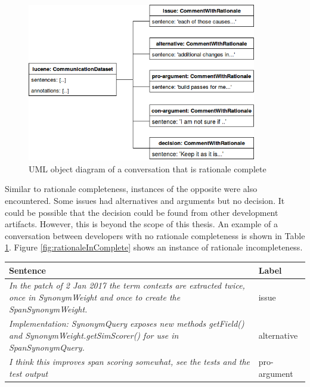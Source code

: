 \documentclass[a4paper,12pt,twoside]{report}
\begin{document}
\begin{figure}[H] %
    \centering
    \includegraphics[width=10cm]{rationale-complete}
    \caption{UML object diagram of a conversation that is rationale complete}
    \label{fig:rationaleComplete}
\end{figure}
\noindent
Similar to rationale completeness, instances of the opposite were also encountered. Some issues had alternatives and arguments but no decision. It could be possible that the decision could be found from other development artifacts. However, this is beyond the scope of this thesis. An example of a conversation between developers with no rationale completeness is shown in Table \ref{tab:incompleterationaleExample}. Figure \ref{fig:rationaleInComplete} shows an instance of rationale incompleteness. 
\begin{table} [H]%
    \centering
    \begin{adjustbox}{max width=\columnwidth}
    \def\arraystretch{1} %
    \begin{tabular}{p{12cm} p{3cm}}
        \toprule
        \textbf{Sentence} & \textbf{Label}\\
        \midrule
			\textit{In the patch of 2 Jan 2017 the term contexts are extracted twice, once in SynonymWeight and once to create the SpanSynonymWeight.} & issue\\
			\midrule
			\textit{Implementation: SynonymQuery exposes new methods getField() and SynonymWeight.getSimScorer() for use in SpanSynonymQuery.} & alternative \\ 
			\midrule
			\textit{I think this improves span scoring somewhat, see the tests and the test output} & pro-argument \\ 
        \midrule
    \end{tabular}
    \end{adjustbox}
    \label{tab:incompleterationaleExample}
\end{table}
\end{document}

